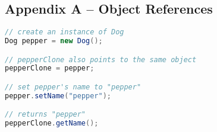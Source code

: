 \subsection*{Appendix A -- Object References} \label{App:AppendixA}
\begin{lstlisting}[language=Java]
// create an instance of Dog
Dog pepper = new Dog();

// pepperClone also points to the same object
pepperClone = pepper;

// set pepper's name to "pepper"
pepper.setName("pepper");

// returns "pepper"
pepperClone.getName();

\end{lstlisting}